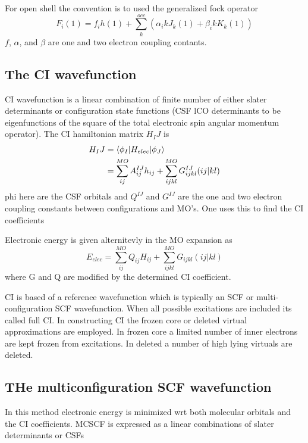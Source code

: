 		For open shell the convention is to used the generalized fock operator
			\begin{equation}
				F_i(1) = f_ih(1) + \sum_k^{occ}(\alpha_ik J_k(1) + \beta_ikK_k(1))
			\end{equation}
		$f$, $\alpha$, and $\beta$ are one and two electron coupling contants.  
	\subsection{The CI wavefunction}
		CI wavefunction is a linear combination of finite number of either slater determinants or configuration state functions (CSF lCO determinants to be eigenfunctions of the square of the total electronic spin angular momentum operator).
		The CI hamiltonian matrix $H_IJ$ is 
			\begin{equation}
				\begin{aligned}
					H_IJ &= \langle\phi_I | H_{elec} | \phi_J \rangle \\
					&= \sum_{ij}^{MO} A_{ij}^{IJ} h_{ij} + \sum_{ijkl}^{MO}G_{ijkl}^{IJ}(ij|kl)
				\end{aligned}
			\end{equation}
			phi here are the CSF orbitals and $Q^{IJ}$ and $G^{IJ}$ are the one and two electron coupling constants between configurations and MO's. One uses this to find the CI coefficients

			Electronic energy is given alternitevly in the MO expansion as 
				\begin{equation}
					E_{elec} = \sum_{ij}^{MO} Q_{ij}H_{ij} + \sum_{ijkl}^{MO}G_{ijkl}(ij|kl)
				\end{equation}
			where G and Q are modified by the determined CI coefficient.  

			CI is based of a reference wavefunction which is typically an SCF or multi-configuration SCF wavefunction.  When all possible excitations are included its called full CI.  In constructing CI the frozen core or deleted virtual approximations are employed.  In frozen core a limited number of inner electrons are kept frozen from excitations.  In deleted a number of high lying virtuals are deleted.
	\subsection{THe multiconfiguration SCF wavefunction}
		In this method electronic energy is minimized wrt both molecular orbitals and the CI coefficients.  MCSCF is expressed as a linear combinations of slater determinants or CSFs

